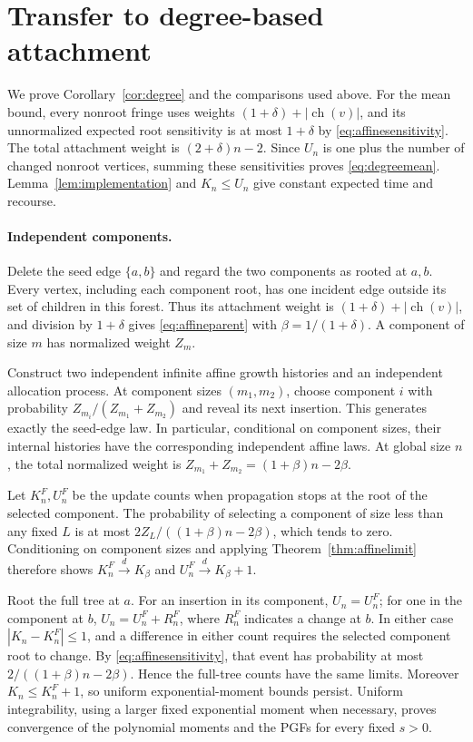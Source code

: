 \documentclass[runningheads,envcountsame,orivec]{llncs}
\newcommand{\ch}{\operatorname{ch}}
\begin{document}
\section{Transfer to degree-based attachment}\label{app:degree}
We prove Corollary~\ref{cor:degree} and the comparisons used above.
For the mean bound, every nonroot fringe uses weights
$(1+\delta)+|\ch(v)|$, and its unnormalized expected root
sensitivity is at most $1+\delta$ by \eqref{eq:affinesensitivity}.
The total attachment weight is $(2+\delta)n-2$. Since $U_n$ is one
plus the number of changed nonroot vertices, summing these sensitivities
proves \eqref{eq:degreemean}. Lemma~\ref{lem:implementation} and
$K_n\le U_n$ give constant expected time and recourse.

\paragraph{Independent components.}
Delete the seed edge $\{a,b\}$ and regard the two components as
rooted at $a,b$. Every vertex, including each component root, has
one incident edge outside its set of children in this forest. Thus
its attachment weight is
$(1+\delta)+|\ch(v)|$, and division by $1+\delta$ gives
\eqref{eq:affineparent} with $\beta=1/(1+\delta)$.
A component of size $m$ has normalized weight $Z_m$.

Construct two independent infinite affine growth histories and an
independent allocation process. At component sizes $(m_1,m_2)$,
choose component $i$ with probability $Z_{m_i}/(Z_{m_1}+Z_{m_2})$
and reveal its next insertion. This generates exactly the seed-edge
law. In particular, conditional on component sizes, their internal
histories have the corresponding independent affine laws. At global
size $n$, the total normalized weight is
$Z_{m_1}+Z_{m_2}=(1+\beta)n-2\beta$.

Let $K_n^F,U_n^F$ be the update counts when propagation stops at the
root of the selected component. The probability of selecting a
component of size less than any fixed $L$ is at most
$2Z_L/((1+\beta)n-2\beta)$, which tends to zero. Conditioning on
component sizes and applying Theorem~\ref{thm:affinelimit} therefore
shows $K_n^F\xrightarrow{d}K_\beta$ and
$U_n^F\xrightarrow{d}K_\beta+1$.

Root the full tree at $a$. For an insertion in its component,
$U_n=U_n^F$; for one in the component at $b$,
$U_n=U_n^F+R_n^F$, where $R_n^F$ indicates a change at $b$.
In either case $|K_n-K_n^F|\le1$, and a difference in either count
requires the selected component root to change. By
\eqref{eq:affinesensitivity}, that event has probability at most
$2/((1+\beta)n-2\beta)$. Hence the full-tree counts have the same
limits. Moreover $K_n\le K_n^F+1$, so uniform exponential-moment
bounds persist. Uniform integrability, using a larger fixed
exponential moment when necessary, proves convergence of the
polynomial moments and the PGFs for every fixed $s>0$.
\end{document}
